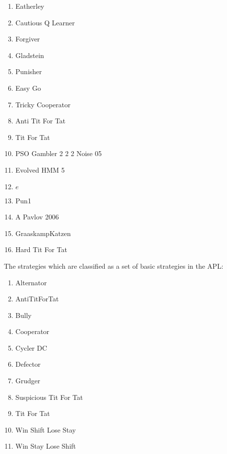 \begin{multicols}{3}
\begin{enumerate}
    \item Eatherley
    \item Cautious Q Learner
    \item Forgiver
    \item Gladstein
    \item Punisher
    \item Easy Go
    \item Tricky Cooperator
    \item Anti Tit For Tat
    \item Tit For Tat
    \item PSO Gambler 2 2 2 Noise 05
    \item Evolved HMM 5
    \item $e$
    \item Pun1
    \item A Pavlov 2006
    \item GraaskampKatzen
    \item Hard Tit For Tat
\end{enumerate}
\end{multicols}

The \basicstrategies strategies which are classified as a set of basic strategies
in the APL:

\begin{multicols}{3}
\begin{enumerate}
    \item Alternator
    \item AntiTitForTat
    \item Bully
    \item Cooperator
    \item Cycler DC
    \item Defector
    \item Grudger
    \item Suspicious Tit For Tat
    \item Tit For Tat
    \item Win Shift Lose Stay
    \item Win Stay Lose Shift
\end{enumerate}
\end{multicols}